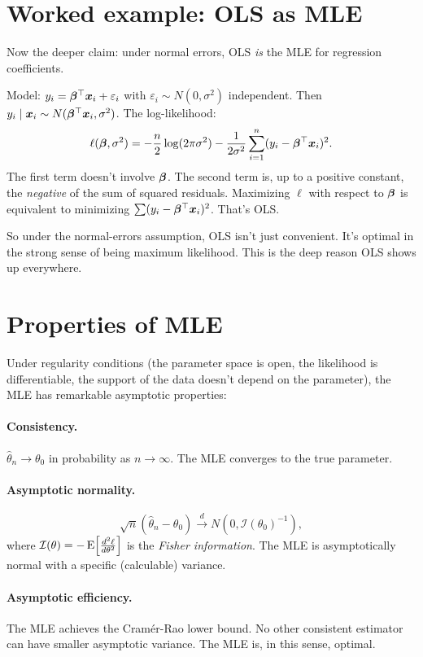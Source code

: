 \section{Worked example: OLS as MLE}

Now the deeper claim: under normal errors, OLS \emph{is} the MLE for regression coefficients.

Model: $y_i = \bm{\beta}^\top \bm{x}_i + \varepsilon_i$ with $\varepsilon_i \sim N(0, \sigma^2)$ independent. Then $y_i \mid \bm{x}_i \sim N(\bm{\beta}^\top \bm{x}_i, \sigma^2)$. The log-likelihood:
\[
  \ell(\bm{\beta}, \sigma^2) = -\frac{n}{2}\log(2\pi\sigma^2) - \frac{1}{2\sigma^2}\sum_{i=1}^{n}(y_i - \bm{\beta}^\top \bm{x}_i)^2.
\]
The first term doesn't involve $\bm{\beta}$. The second term is, up to a positive constant, the \emph{negative} of the sum of squared residuals. Maximizing $\ell$ with respect to $\bm{\beta}$ is equivalent to minimizing $\sum (y_i - \bm{\beta}^\top \bm{x}_i)^2$. That's OLS.

So under the normal-errors assumption, OLS isn't just convenient. It's optimal in the strong sense of being maximum likelihood. This is the deep reason OLS shows up everywhere.

\section{Properties of MLE}

Under regularity conditions (the parameter space is open, the likelihood is differentiable, the support of the data doesn't depend on the parameter), the MLE has remarkable asymptotic properties:

\paragraph{Consistency.} $\hat\theta_n \to \theta_0$ in probability as $n \to \infty$. The MLE converges to the true parameter.

\paragraph{Asymptotic normality.}
\[
  \sqrt{n}(\hat\theta_n - \theta_0) \xrightarrow{d} N\!\left(0, \mathcal{I}(\theta_0)^{-1}\right),
\]
where $\mathcal{I}(\theta) = -\operatorname{E}\!\left[\frac{d^2 \ell}{d\theta^2}\right]$ is the \emph{Fisher information}. The MLE is asymptotically normal with a specific (calculable) variance.

\paragraph{Asymptotic efficiency.} The MLE achieves the Cramér-Rao lower bound. No other consistent estimator can have smaller asymptotic variance. The MLE is, in this sense, optimal.

